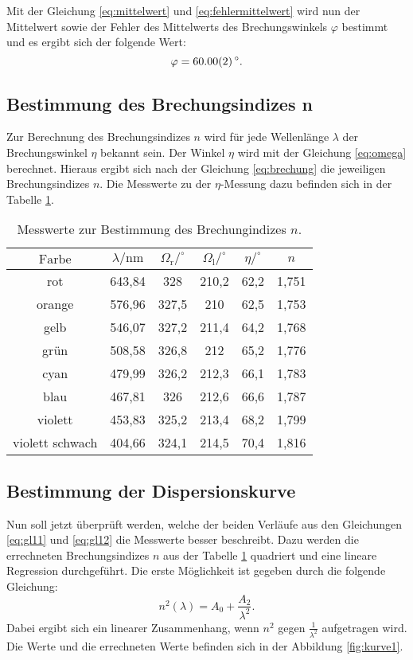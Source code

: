 Mit der Gleichung \ref{eq:mittelwert} und \ref{eq:fehlermittelwert} wird nun der Mittelwert sowie der Fehler des Mittelwerts des Brechungswinkels $\varphi$ bestimmt und es ergibt sich der folgende Wert:
\begin{equation*}
\varphi = \SI{60,00 \pm 0,02}{^\circ}.
\end{equation*}

\subsection{Bestimmung des Brechungsindizes n}
Zur Berechnung des Brechungsindizes $n$ wird für jede Wellenlänge $\lambda$ der Brechungswinkel $\eta$ bekannt sein. Der Winkel $\eta$ wird mit der Gleichung \ref{eq:omega} berechnet. Hieraus ergibt sich nach der Gleichung \ref{eq:brechung} die jeweiligen Brechungsindizes $n$. Die Messwerte zu der $\eta$-Messung dazu befinden sich in der Tabelle \ref{tab:brechungswinkel2}.

\begin{table}[htpb]
	\centering
	\caption{Messwerte zur Bestimmung des Brechungindizes $n$.}
	\label{tab:brechungswinkel2}
	\begin{tabular}{c c c c c c}
		\toprule
		$\text{Farbe}$  & $\lambda / \si{\nano\meter}$ & $\Omega_\text{r} / ^\circ$ & $\Omega_\text{l}/ ^\circ$ & $\eta / ^\circ$ & $n$ \\
		\midrule
		rot & 643,84 & 328 & 210,2 & 62,2 & 1,751\\
		orange & 576,96 & 327,5 & 210 & 62,5 & 1,753\\
 		gelb & 546,07 & 327,2 & 211,4 & 64,2 & 1,768\\
		grün & 508,58 & 326,8 & 212 & 65,2 & 1,776\\
		cyan & 479,99 & 326,2 & 212,3 & 66,1 & 1,783\\
 		blau & 467,81 & 326 & 212,6  & 66,6 & 1,787\\
		violett & 453,83 & 325,2 & 213,4 & 68,2 & 1,799\\
 		violett schwach & 404,66 & 324,1 & 214,5 & 70,4 & 1,816\\
		\bottomrule
	\end{tabular}
\end{table}

\subsection{Bestimmung der Dispersionskurve}
Nun soll jetzt überprüft werden, welche der beiden Verläufe aus den Gleichungen \ref{eq:gl11} und \ref{eq:gl12} die Messwerte besser beschreibt. Dazu werden die errechneten Brechungsindizes $n$ aus der Tabelle \ref{tab:brechungswinkel2} quadriert und eine lineare Regression durchgeführt. Die erste Möglichkeit ist gegeben durch die folgende Gleichung:
\begin{equation}
\label{eq:first}
n^{2}(\lambda) = A_0 + \frac{A_2}{\lambda^{2}}.
\end{equation}
Dabei ergibt sich ein linearer Zusammenhang, wenn $n^{2}$ gegen $\frac{1}{\lambda^{2}}$ aufgetragen wird. Die Werte und die errechneten Werte befinden sich in der Abbildung \ref{fig:kurve1}.

